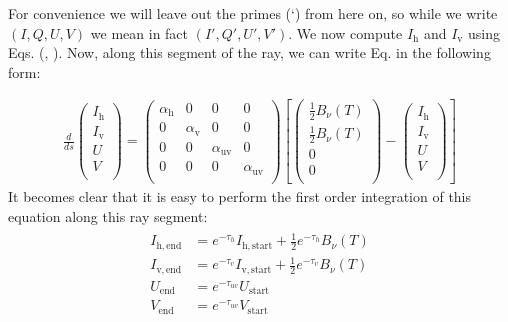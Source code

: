 \documentclass[letterpaper,10pt,english]{sphinxmanual}
\begin{document}
For convenience we will leave out the primes (‘) from here on, so while we write
\((I,Q,U,V)\) we mean in fact \((I',Q',U',V')\). We now compute
\(I_{\mathrm{h}}\) and \(I_{\mathrm{v}}\) using
Eqs. (, ). Now, along this
segment of the ray, we can write
Eq.  in the following form:

\label{\detokenize{dustradtrans:eq-firstorder-int-emisabs}}\begin{equation*}
\begin{split}\frac{d}{ds}
\left(\begin{matrix}
I_{\mathrm{h}} \\
I_{\mathrm{v}} \\
U \\
V \\
\end{matrix}\right)
=
\left(\begin{matrix}
\alpha_{\mathrm{h}} & 0 & 0 & 0 \\
0 & \alpha_{\mathrm{v}} & 0 & 0  \\
0 & 0 & \alpha_{\mathrm{uv}} & 0 \\
0 & 0 & 0 & \alpha_{\mathrm{uv}} \\
\end{matrix}\right)
\left[
\left(\begin{matrix}
\tfrac{1}{2} B_\nu(T) \\
\tfrac{1}{2} B_\nu(T) \\
0 \\
0 \\
\end{matrix}\right)
-
\left(\begin{matrix}
I_{\mathrm{h}} \\
I_{\mathrm{v}} \\
U \\
V \\
\end{matrix}\right)\right]\end{split}
\end{equation*}
It becomes clear that it is easy to perform the first order integration of this
equation along this ray segment:
\begin{equation*}
\begin{split}\begin{split}
I_{\mathrm{h,end}} &=  e^{-\tau_h}I_{\mathrm{h,start}} + \tfrac{1}{2}e^{-\tau_h}B_\nu(T)\\
I_{\mathrm{v,end}} &=  e^{-\tau_v}I_{\mathrm{v,start}} + \tfrac{1}{2}e^{-\tau_v}B_\nu(T) \\
U_{\mathrm{end}} &=    e^{-\tau_{uv}}U_{\mathrm{start}}\\
V_{\mathrm{end}} &=    e^{-\tau_{uv}}V_{\mathrm{start}}
\end{split}\end{split}
\end{equation*}
\end{document}
